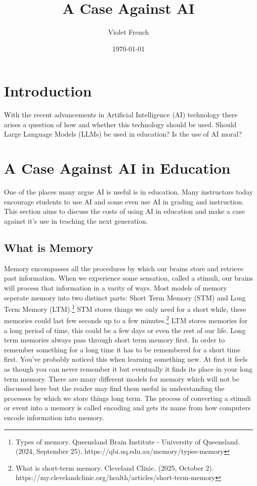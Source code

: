\documentclass{article}[12pt]
\title{A Case Against AI}
\author{Violet French}
\date{\today}
\begin{document}
\maketitle
\newpage
\tableofcontents
\listoffigures
\newpage

\section{Introduction}
With the recent advancements in Artificial Intelligence (AI) technology there arises a question of how and whether this technology should be used. Should Large Language Models (LLMs) be used in education? Is the use of AI moral? 


\section{A Case Against AI in Education}
One of the places many argue AI is useful is in education. Many instructors today encourage students to use AI and some even use AI in grading and instruction. This section aims to discuss the costs of using AI in education and make a case against it's use in teaching the next generation.

\subsection{What is Memory}
Memory encompasses all the procedures by which our brains store and retrieve past information. When we experience some sensation, called a stimuli, our brains will process that information in a varity of ways. Most models of memory seperate memory into two distinct parts: Short Term Memory (STM) and Long Term Memory (LTM).\footnote{\raggedright Types of memory. Queensland Brain Institute - University of Queensland. (2024, September 25). https://qbi.uq.edu.au/memory/types-memory} STM stores things we only need for a short while, these memories could last few seconds up to a few minutes.\footnote{\raggedright What is short-term memory. Cleveland Clinic. (2025, October 2). https://my.clevelandclinic.org/health/articles/short-term-memory} LTM stores memories for a long period of time, this could be a few days or even the rest of our life. Long term memories always pass through short term memory first. In order to remember something for a long time it has to be remembered for a short time first. You've probably noticed this when learning something new. At first it feels as though you can never remember it but eventually it finds its place in your long term memory. There are many different models for memory which will not be discussed here but the reader may find them useful in understanding the processes by which we store things long term. The process of converting a stimuli or event into a memory is called encoding and gets its name from how computers encode information into memory.
\end{document}

